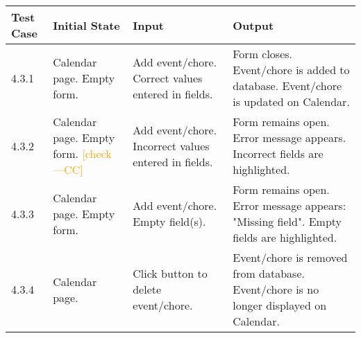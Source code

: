 \documentclass[12pt]{article}
\newcommand{\authornote}[3]{\textcolor{#1}{[#3 ---#2]}}
\newcommand{\authornote}[3]{}
\newcommand{\cc}[1]{\authornote{orange}{CC}{#1}}
\begin{document}
\begin{longtable}{|p{2cm}|p{3cm}|p{5cm}|p{5cm}|}
\hline
\textbf{Test Case}  & \textbf{Initial State} & \textbf{Input} & \textbf{Output} \\ \hline
4.3.1 & Calendar page. Empty form. & Add event/chore. Correct values entered in fields. & Form closes. Event/chore is added to database. Event/chore is updated on Calendar. \\ 
\hline
4.3.2 & Calendar page. Empty form. \cc{check} & Add event/chore. Incorrect values entered in fields. & Form remains open. Error message appears. Incorrect fields are highlighted. \\
\hline
4.3.3 & Calendar page. Empty form. & Add event/chore. Empty field(s). & Form remains open. Error message appears: "Missing field". Empty fields are highlighted. \\
\hline
4.3.4 & Calendar page. & Click button to delete event/chore.  & Event/chore is removed from database. Event/chore is no longer displayed on Calendar. \\
\hline
\end{longtable}
\end{document}
